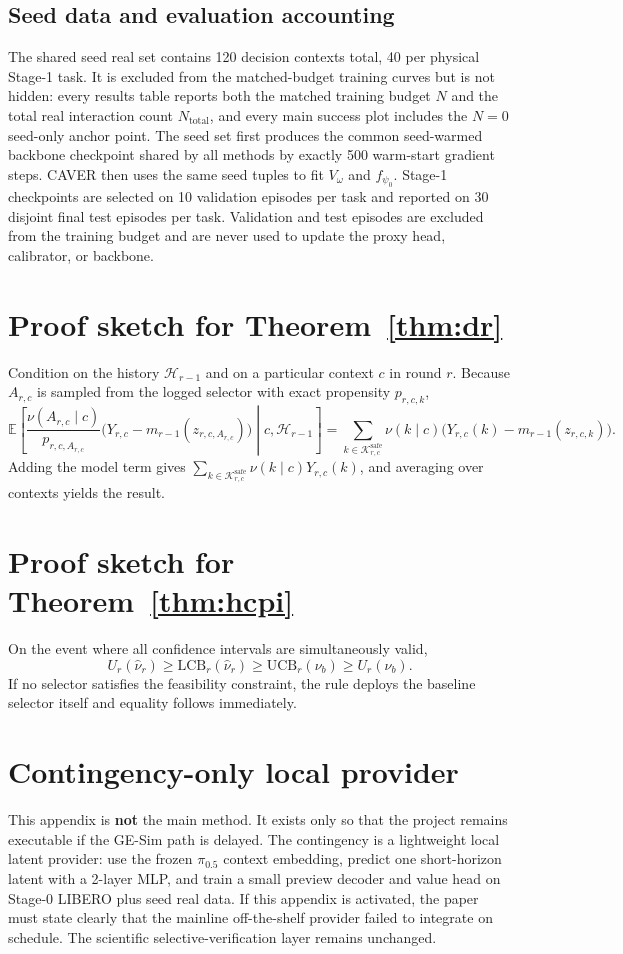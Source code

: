 \documentclass[10pt]{article}
\theoremstyle{plain}
\theoremstyle{definition}
\theoremstyle{remark}
\newcommand{\E}{\mathbb{E}}
\newcommand{\LCB}{\mathrm{LCB}}
\newcommand{\UCB}{\mathrm{UCB}}
\begin{document}
\subsection{Seed data and evaluation accounting}
The shared seed real set contains 120 decision contexts total, 40 per physical Stage-1 task. It is excluded from the matched-budget training curves but is not hidden: every results table reports both the matched training budget $N$ and the total real interaction count $N_{\mathrm{total}}$, and every main success plot includes the $N=0$ seed-only anchor point. The seed set first produces the common seed-warmed backbone checkpoint shared by all methods by exactly 500 warm-start gradient steps. CAVER then uses the same seed tuples to fit $V_{\omega}$ and $f_{\psi_0}$. Stage-1 checkpoints are selected on 10 validation episodes per task and reported on 30 disjoint final test episodes per task. Validation and test episodes are excluded from the training budget and are never used to update the proxy head, calibrator, or backbone.

\section{Proof sketch for Theorem~\ref{thm:dr}}
Condition on the history $\mathcal H_{r-1}$ and on a particular context $c$ in round $r$. Because $A_{r,c}$ is sampled from the logged selector with exact propensity $p_{r,c,k}$,
\[
\E\left[\frac{\nu(A_{r,c}\mid c)}{p_{r,c,A_{r,c}}}\big(Y_{r,c}-m_{r-1}(z_{r,c,A_{r,c}})\big)\middle|c,\mathcal H_{r-1}\right]=\sum_{k\in\mathcal K^{\mathrm{safe}}_{r,c}}\nu(k\mid c)\big(Y_{r,c}(k)-m_{r-1}(z_{r,c,k})\big).
\]
Adding the model term gives $\sum_{k\in\mathcal K^{\mathrm{safe}}_{r,c}}\nu(k\mid c)Y_{r,c}(k)$, and averaging over contexts yields the result.

\section{Proof sketch for Theorem~\ref{thm:hcpi}}
On the event where all confidence intervals are simultaneously valid,
\[
U_r(\hat\nu_r)\ge \LCB_r(\hat\nu_r)\ge \UCB_r(\nu_b)\ge U_r(\nu_b).
\]
If no selector satisfies the feasibility constraint, the rule deploys the baseline selector itself and equality follows immediately.

\section{Contingency-only local provider}\label{app:contingency}
This appendix is \textbf{not} the main method. It exists only so that the project remains executable if the GE-Sim path is delayed. The contingency is a lightweight local latent provider: use the frozen $\pi_{0.5}$ context embedding, predict one short-horizon latent with a 2-layer MLP, and train a small preview decoder and value head on Stage-0 LIBERO plus seed real data. If this appendix is activated, the paper must state clearly that the mainline off-the-shelf provider failed to integrate on schedule. The scientific selective-verification layer remains unchanged.

{\footnotesize\sloppy}
\end{document}
